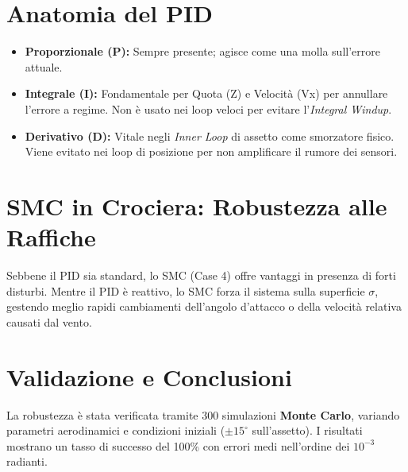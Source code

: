 \documentclass[12pt,a4paper]{article}
\begin{document}
\section{Anatomia del PID}
\begin{itemize}
    \item \textbf{Proporzionale (P):} Sempre presente; agisce come una molla sull'errore attuale.
    \item \textbf{Integrale (I):} Fondamentale per Quota (Z) e Velocità (Vx) per annullare l'errore a regime. Non è usato nei loop veloci per evitare l'\textit{Integral Windup}.
    \item \textbf{Derivativo (D):} Vitale negli \textit{Inner Loop} di assetto come smorzatore fisico. Viene evitato nei loop di posizione per non amplificare il rumore dei sensori.
\end{itemize}

\section{SMC in Crociera: Robustezza alle Raffiche}
Sebbene il PID sia standard, lo SMC (Case 4) offre vantaggi in presenza di forti disturbi. Mentre il PID è reattivo, lo SMC forza il sistema sulla superficie $\sigma$, gestendo meglio rapidi cambiamenti dell'angolo d'attacco o della velocità relativa causati dal vento.

\section{Validazione e Conclusioni}
La robustezza è stata verificata tramite 300 simulazioni \textbf{Monte Carlo}, variando parametri aerodinamici e condizioni iniziali ($\pm 15^\circ$ sull'assetto). I risultati mostrano un tasso di successo del 100\% con errori medi nell'ordine dei $10^{-3}$ radianti.
\end{document}
